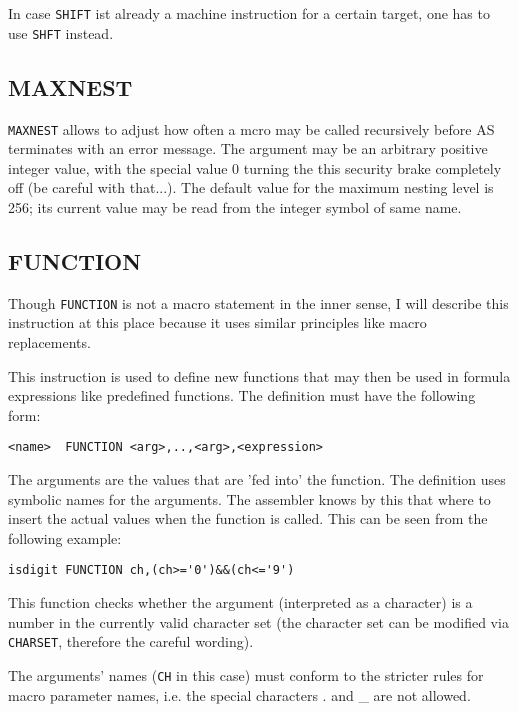\documentclass[12pt,twoside]{report}
\makeatletter
\newcommand{\tty}[1]{{\tt #1}}
\newcommand{\ttindex}[1]{\index{#1@{\tt #1}}}
\makeatother
\begin{document}
In case {\tt SHIFT} ist already a machine instruction for a certain target,
one has to use {\tt SHFT} instead.


\subsection{MAXNEST}
\ttindex{MAXNEST}

{\tt MAXNEST} allows to adjust how often a mcro may be called recursively
before AS terminates with an error message.  The argument may be an
arbitrary positive integer value, with the special value 0 turning the
this security brake completely off (be careful with that...).  The default
value for the maximum nesting level is 256; its current value may be read
from the integer symbol of same name.


\subsection{FUNCTION}
\label{SectFUNCTION}
\ttindex{FUNCTION}

Though \tty{FUNCTION} is not a macro statement in the inner sense, I will
describe this instruction at this place because it uses similar principles
like macro replacements.

This instruction is used to define new functions that may then be
used in formula expressions like predefined functions.  The
definition must have the following form:
\begin{verbatim}
<name>  FUNCTION <arg>,..,<arg>,<expression>
\end{verbatim}
The arguments are the values that are 'fed into' the function.  The
definition uses symbolic names for the arguments.  The assembler
knows by this that where to insert the actual values when the
function is called.  This can be seen from the following example:
\begin{verbatim}
isdigit FUNCTION ch,(ch>='0')&&(ch<='9')
\end{verbatim}
This function checks whether the argument (interpreted as a character) is
a number in the currently valid character set (the character set can be
modified via \tty{CHARSET}, therefore the careful wording).

The arguments' names (\tty{CH} in this case) must conform to the stricter
rules for macro parameter names, i.e. the special characters . and \_
are not allowed.
\end{document}
